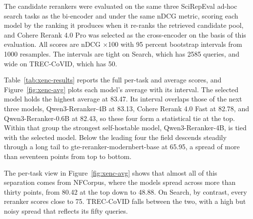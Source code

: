 The candidate rerankers were evaluated on the same three SciRepEval ad-hoc search tasks as the bi-encoder and under the same nDCG metric, scoring each model by the ranking it produces when it re-ranks the retrieved candidate pool, and Cohere Rerank 4.0 Pro was selected as the cross-encoder on the basis of this evaluation. All scores are nDCG $\times$100 with 95 percent bootstrap intervals from 1000 resamples. The intervals are tight on Search, which has 2585 queries, and wide on TREC-CoVID, which has 50.

Table~\ref{tab:xenc-results} reports the full per-task and average scores, and Figure~\ref{fig:xenc-avg} plots each model's average with its interval. The selected model holds the highest average at 83.47. Its interval overlaps those of the next three models, Qwen3-Reranker-4B at 83.13, Cohere Rerank 4.0 Fast at 82.78, and Qwen3-Reranker-0.6B at 82.43, so these four form a statistical tie at the top. Within that group the strongest self-hostable model, Qwen3-Reranker-4B, is tied with the selected model. Below the leading four the field descends steadily through a long tail to gte-reranker-modernbert-base at 65.95, a spread of more than seventeen points from top to bottom.

The per-task view in Figure~\ref{fig:xenc-avg} shows that almost all of this separation comes from NFCorpus, where the models spread across more than thirty points, from 80.42 at the top down to 48.88. On Search, by contrast, every reranker scores close to 75. TREC-CoVID falls between the two, with a high but noisy spread that reflects its fifty queries.

